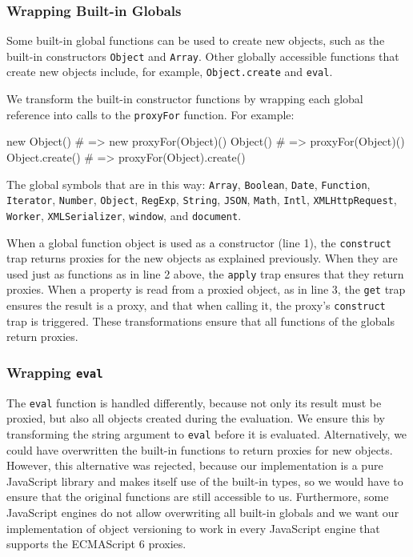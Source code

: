 \subsubsection{Wrapping Built-in Globals}

Some built-in global functions can be used to create new objects, such as the built-in constructors \lstinline{Object} and \lstinline{Array}.
Other globally accessible functions that create new objects include, for example, \lstinline{Object.create} and \lstinline{eval}.

We transform the built-in constructor functions by wrapping each global reference into calls to the \lstinline{proxyFor} function.
For example:
\begin{code}
new Object()  # => new proxyFor(Object)()
Object()  # => proxyFor(Object)()
Object.create()  # => proxyFor(Object).create()
\end{code}

The global symbols that are in this way: \lstinline{Array}, \lstinline{Boolean}, \lstinline{Date}, \lstinline{Function}, \lstinline{Iterator}, \lstinline{Number}, \lstinline{Object}, \lstinline{RegExp}, \lstinline{String}, \lstinline{JSON}, \lstinline{Math}, \lstinline{Intl}, \lstinline{XMLHttpRequest}, \lstinline{Worker}, \lstinline{XMLSerializer}, \lstinline{window}, and \lstinline{document}.

When a global function object is used as a constructor (line 1), the \lstinline{construct} trap returns proxies for the new objects as explained previously.
When they are used just as functions as in line 2 above, the \lstinline{apply} trap ensures that they return proxies.
When a property is read from a proxied object, as in line 3, the \lstinline{get} trap ensures the result is a proxy, and that when calling it, the proxy's \lstinline{construct} trap is triggered.
These transformations ensure that all functions of the globals return proxies.

\subsubsection{Wrapping \lstinline{eval}}

The \lstinline{eval} function is handled differently, because not only its result must be proxied, but also all objects created during the evaluation.
We ensure this by transforming the string argument to \lstinline{eval} before it is evaluated.
Alternatively, we could have overwritten the built-in functions to return proxies for new objects.
However, this alternative was rejected, because our implementation is a pure JavaScript library and makes itself use of the built-in types, so we would have to ensure that the original functions are still accessible to us.
Furthermore, some JavaScript engines do not allow overwriting all built-in globals and we want our implementation of object versioning to work in every JavaScript engine that supports the ECMAScript 6 proxies.

